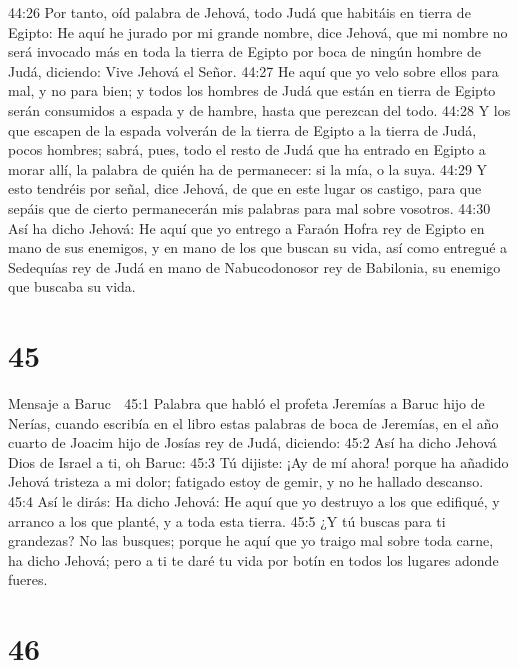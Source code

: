 44:26 Por tanto, oíd palabra de Jehová, todo Judá que habitáis en tierra de Egipto: He aquí he jurado por mi grande nombre, dice Jehová, que mi nombre no será invocado más en toda la tierra de Egipto por boca de ningún hombre de Judá, diciendo: Vive Jehová el Señor.  
44:27 He aquí que yo velo sobre ellos para mal, y no para bien; y todos los hombres de Judá que están en tierra de Egipto serán consumidos a espada y de hambre, hasta que perezcan del todo.  
44:28 Y los que escapen de la espada volverán de la tierra de Egipto a la tierra de Judá, pocos hombres; sabrá, pues, todo el resto de Judá que ha entrado en Egipto a morar allí, la palabra de quién ha de permanecer: si la mía, o la suya.  
44:29 Y esto tendréis por señal, dice Jehová, de que en este lugar os castigo, para que sepáis que de cierto permanecerán mis palabras para mal sobre vosotros.  
44:30 Así ha dicho Jehová: He aquí que yo entrego a Faraón Hofra rey de Egipto en mano de sus enemigos, y en mano de los que buscan su vida, así como entregué a Sedequías rey de Judá en mano de Nabucodonosor rey de Babilonia, su enemigo que buscaba su vida.  

\chapter{45}

Mensaje a Baruc  

45:1 Palabra que habló el profeta Jeremías a Baruc hijo de Nerías, cuando escribía en el libro estas palabras de boca de Jeremías, en el año cuarto de Joacim hijo de Josías rey de Judá, diciendo:  
45:2 Así ha dicho Jehová Dios de Israel a ti, oh Baruc:  
45:3 Tú dijiste: ¡Ay de mí ahora! porque ha añadido Jehová tristeza a mi dolor; fatigado estoy de gemir, y no he hallado descanso.  
45:4 Así le dirás: Ha dicho Jehová: He aquí que yo destruyo a los que edifiqué, y arranco a los que planté, y a toda esta tierra.  
45:5 ¿Y tú buscas para ti grandezas? No las busques; porque he aquí que yo traigo mal sobre toda carne, ha dicho Jehová; pero a ti te daré tu vida por botín en todos los lugares adonde fueres.  

\chapter{46}

